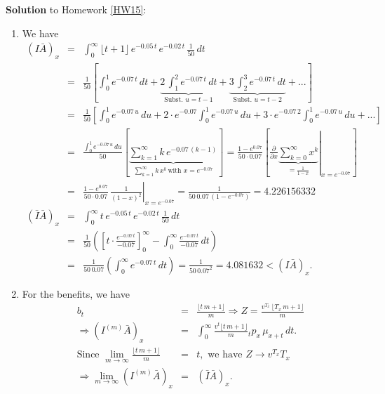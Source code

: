 \documentclass[11pt,fleqn,oneside]{book}
\begin{document}
\noindent \textbf{Solution} to Homework \ref{HW15}:
\footnotesize
\begin{enumerate}
\item We have
\begin{eqnarray*}
\left(I\bar{A}\right)_x &=& \int_0^{\infty} \lfloor t+1 \rfloor\, e^{-0.05\,t}\, e^{-0.02\,t}\,\frac{1}{50}\,dt \\
&=& \frac{1}{50} \left[\int_0^1 e^{-0.07\,t}\,dt + \underbrace{2\,\int_1^2 e^{-0.07\,t}\,dt}_{\text{Subst. }u=t-1} + \underbrace{3\,\int_2^3 e^{-0.07\,t}\,dt}_{\text{Subst. }u=t-2} + ... \right]\\
&=& \frac{1}{50}\left[\int_0^1 e^{-0.07\,u}\,du + 2 \cdot e^{-0.07}\int_0^1 e^{-0.07\,u}\,du + 3
\cdot e^{-0.07\,2} \int_0^1 e^{-0.07\,u}\,du + ...\right]\\
&=&  \frac{\int_0^1 e^{-0.07\,u}\,du}{50} \left[\underbrace{\sum_{k=1}^{\infty} k\,e^{-0.07\,(k-1)}}_{\sum_{k=1}^{\infty} k\,x^k\,\text{with }x=e^{-0.07} }\right]
= \frac{1-e^{0.07}}{50\cdot 0.07 } \left[ \left.\frac{\partial}{\partial x} \underbrace{\sum_{k=0}^{\infty} x^k}_{=\frac{1}{1-x}} \right|_{x=e^{-0.07}}\right]\\
&=& \frac{1-e^{0.07}}{50\cdot 0.07 } \, \left.\frac{1}{(1-x)^2}\right|_{x=e^{-0.07}} 
= \frac{1}{50\,0.07\,(1-e^{-0.07})} = 4.226156332  \\
\left(\bar{I}\bar{A}\right)_x &=& \int_0^{\infty} t\,e^{-0.05\,t}\,e^{-0.02\,t}\,\frac{1}{50}\,dt\\
&=& \frac{1}{50} \left(\left[t\cdot \frac{e^{-0.07\,t}}{-0.07}\right]_0^{\infty} - \int_0^{\infty} \frac{e^{-0.07\,t}}{-0.07}\,dt \right)\\
&=& \frac{1}{50\,0.07} \left(\int_0^{\infty} e^{-0.07\,t}\,dt\right) = \frac{1}{50\,0.07^2}
= 4.081632 < \left(I\bar{A}\right)_x. 
\end{eqnarray*}
\item For the benefits, we have
\begin{eqnarray*}
b_t &=& \frac{\lfloor t\,m + 1\rfloor}{m} \Rightarrow Z =  \frac{v^{T_x}\,\lfloor T_x\,m + 1\rfloor}{m}\\
\Rightarrow \left(I^{(m)}\bar{A}\right)_x &=& \int_0^{\infty} \frac{v^t\lfloor t\,m + 1\rfloor}{m} {_tp_x}\,{\mu_{x+t}}\,dt.\\
\text{Since }\lim_{m\rightarrow \infty} \frac{\lfloor t\,m + 1\rfloor}{m} &=& t,\text{ we have }
Z \rightarrow v^{T_x} T_x\\
\Rightarrow \lim_{m \rightarrow \infty} \left(I^{(m)}\bar{A}\right)_x &=& \left(\bar{I}\bar{A}\right)_x.
\end{eqnarray*}

\end{enumerate}
\end{document}
